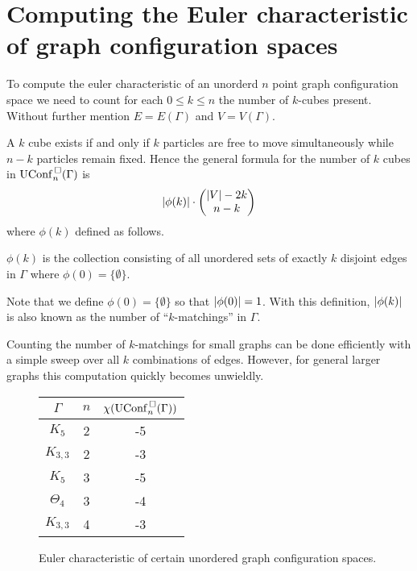 \section{Computing the Euler characteristic of graph configuration spaces}
To compute the euler characteristic of an unorderd \(n\) point graph configuration space we need to count
for each \(0 \le k \le n\) the number of \(k\)-cubes present.
Without further mention \(E = E(\Gamma)\) and \(V = V(\Gamma)\).

A \(k\) cube exists if and only if \(k\) particles are free to move simultaneously while \(n - k\)
particles remain fixed.
Hence the general formula for the number of \(k\) cubes in \(\mathrm{UConf}^{\,\square}_n(\Gamma)\) is
\[
    \left|\phi(k)\right| \cdot \begin{pmatrix}\left|V\right| - 2k \\ n - k\end{pmatrix}
\]
where \(\phi(k)\) defined as follows.

\begin{defn}
\(\phi(k)\) is the collection consisting of all unordered sets of exactly \(k\) disjoint edges in \(\Gamma\)
where \(\phi(0) = \{\emptyset\}\).
\end{defn}

Note that we define \(\phi(0) = \{\emptyset\}\) so that \(\left|\phi(0)\right| = 1\).
With this definition, \(\left|\phi(k)\right|\) is also known as the number of ``\(k\)-matchings'' in \(\Gamma\).

Counting the number of \(k\)-matchings for small graphs can be done efficiently 
with a simple sweep over all \(k\) combinations of edges.
However, for general larger graphs this computation quickly becomes unwieldly.


\begin{figure}[h!]
\centering
\begin{tabular}{c | c | c}
   \(\Gamma\) & \(n\) & \(\chi(\mathrm{UConf}^{\,\square}_n(\Gamma))\) \\
   \hline
   \(K_5\) & 2 & -5 \\
   \(K_{3,3}\) & 2 & -3 \\
   \(K_5\) & 3 & -5 \\
   \(\Theta_4\) & 3 & -4 \\
   \(K_{3,3}\) & 4 & -3
\end{tabular}
\label{fig:euler_characteristics}
\caption{Euler characteristic of certain unordered graph configuration spaces.}
\end{figure}

